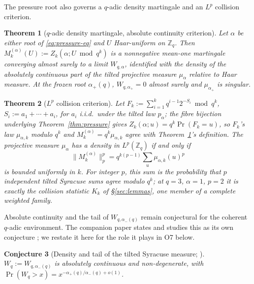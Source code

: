 \documentclass[11pt]{article}
\newtheorem{theorem}{Theorem}[section]
\newtheorem{conjecture}[theorem]{Conjecture}
\theoremstyle{definition}
\theoremstyle{remark}
\begin{document}
The pressure root also governs a $q$-adic density martingale and an
$L^p$ collision criterion.

\begin{theorem}[$q$-adic density martingale, absolute continuity criterion]\label{thm:qadic-martingale}
Let $\alpha$ be either root of \eqref{eq:pressure-eq} and $U$
Haar-uniform on $\mathbb Z_q$. Then $M_k^{(\alpha)}(U):=Z_k(\alpha;U\bmod
q^k)$ is a nonnegative mean-one martingale converging almost surely to
a limit $W_{q,\alpha}$, identified with the density of the absolutely
continuous part of the tilted projective measure $\mu_\alpha$ relative
to Haar measure. At the frozen root $\alpha_+(q)$, $W_{q,\alpha_+}=0$
almost surely and $\mu_{\alpha_+}$ is singular.
\end{theorem}

\begin{theorem}[$L^p$ collision criterion]\label{thm:lp-collision}
Let $F_k:=\sum_{i=1}^kq^{i-1}2^{-S_i}\bmod q^k$, $S_i:=a_1+\cdots+a_i$,
for $a_i$ i.i.d.\ under the tilted law $p_\alpha$; the fibre bijection
underlying Theorem~\ref{thm:pressure} gives
$Z_k(\alpha;u)=q^k\Pr(F_k=u)$, so $F_k$'s law $\mu_{\alpha,k}$ modulo
$q^k$ and $M_k^{(\alpha)}=q^k\mu_{\alpha,k}$ agree with
Theorem~\ref{thm:qadic-martingale}'s definition. The projective measure
$\mu_\alpha$
has a density in $L^p(\mathbb Z_q)$ if and only if
\begin{equation}\label{eq:lp-collision}
\lVert M_k^{(\alpha)}\rVert_p^p=q^{k(p-1)}\sum_u\mu_{\alpha,k}(u)^p
\end{equation}
is bounded uniformly in $k$. For integer $p$, this sum is the probability
that $p$ independent tilted Syracuse sums agree modulo $q^k$; at $q=3$,
$\alpha=1$, $p=2$ it is exactly the collision statistic $K_k$ of
\S\ref{sec:lemmas}, one member of a complete weighted family.
\end{theorem}

Absolute continuity and the tail of $W_{q,\alpha_-(q)}$ remain
conjectural for the coherent $q$-adic environment. The companion paper
states and studies this as its own conjecture \cite{PressureCompanion};
we restate it here for the role it plays in O7 below.

\begin{conjecture}[Density and tail of the tilted Syracuse measure;
\cite{PressureCompanion}]
\label{conj:tail-index}
$W_q:=W_{q,\alpha_-(q)}$ is absolutely continuous and non-degenerate,
with $\Pr(W_q>x)=x^{-\alpha_+(q)/\alpha_-(q)+o(1)}$.
\end{conjecture}
\end{document}
